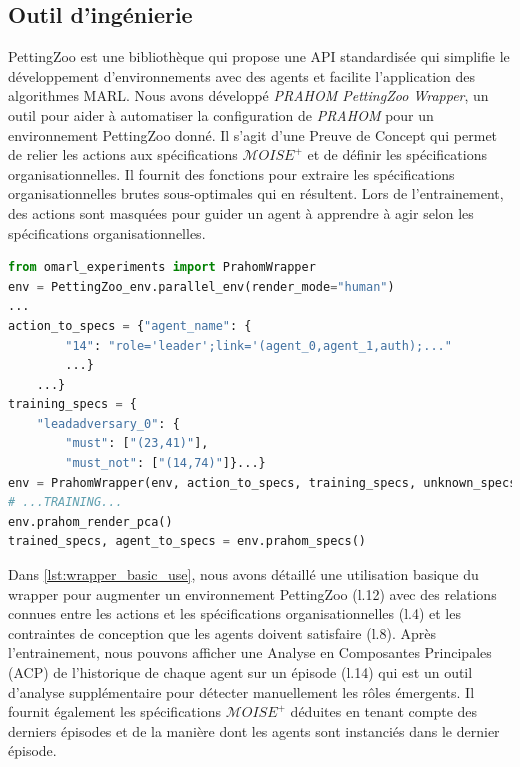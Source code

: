 \documentclass[contribution]{jfsma}
\newcounter{relation}
\begin{document}
\subsection{Outil d'ingénierie}

PettingZoo est une bibliothèque qui propose une API standardisée qui simplifie le développement d'environnements avec des agents et facilite l'application des algorithmes MARL.
Nous avons développé \emph{PRAHOM PettingZoo Wrapper}\label{PettingZoo-wrapper}, un outil pour aider à automatiser la configuration de \emph{PRAHOM} pour un environnement PettingZoo donné.
Il s'agit d'une Preuve de Concept qui permet de relier les actions aux spécifications $\mathcal{M}OISE^+$ et de définir les spécifications organisationnelles. Il fournit des fonctions pour extraire les spécifications organisationnelles brutes sous-optimales qui en résultent. Lors de l'entrainement, des actions sont masquées pour guider un agent à apprendre à agir selon les spécifications organisationnelles.

\begin{lstlisting}[language=Python, caption=PRAHOM PettingZoo Wrapper basic use, label={lst:wrapper_basic_use}]
from omarl_experiments import PrahomWrapper
env = PettingZoo_env.parallel_env(render_mode="human")
...
action_to_specs = {"agent_name": {
        "14": "role='leader';link='(agent_0,agent_1,auth);..."
        ...}    
    ...}
training_specs = {
    "leadadversary_0": {
        "must": ["(23,41)"],
        "must_not": ["(14,74)"]}...}
env = PrahomWrapper(env, action_to_specs, training_specs, unknown_specs_inference=True, pca_output=True)
# ...TRAINING...
env.prahom_render_pca()
trained_specs, agent_to_specs = env.prahom_specs()
\end{lstlisting}

Dans \autoref{lst:wrapper_basic_use}, nous avons détaillé une utilisation basique du wrapper pour augmenter un environnement PettingZoo (l.12) avec des relations connues entre les actions et les spécifications organisationnelles (l.4) et les contraintes de conception que les agents doivent satisfaire (l.8). Après l'entrainement, nous pouvons afficher une Analyse en Composantes Principales (ACP) de l'historique de chaque agent sur un épisode (l.14) qui est un outil d'analyse supplémentaire pour détecter manuellement les rôles émergents. Il fournit également les spécifications $\mathcal{M}OISE^+$ déduites en tenant compte des derniers épisodes et de la manière dont les agents sont instanciés dans le dernier épisode.
\end{document}

